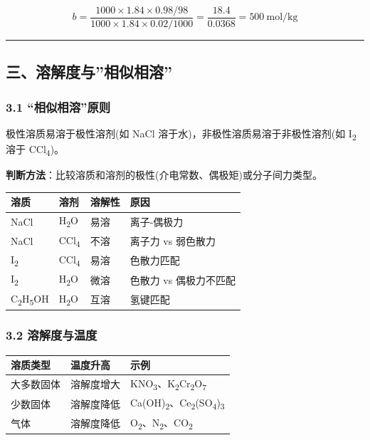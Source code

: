 \[
b = \frac{1000 \times 1.84 \times 0.98 / 98}{1000 \times 1.84 \times 0.02 / 1000} = \frac{18.4}{0.0368} = 500\ \mathrm{mol/kg}
\]

\begin{center}\rule{0.5\linewidth}{0.5pt}\end{center}

\subsection{三、溶解度与''相似相溶''}\label{ux4e09ux6eb6ux89e3ux5ea6ux4e0eux76f8ux4f3cux76f8ux6eb6}

\subsubsection{3.1 ``相似相溶''原则}\label{ux76f8ux4f3cux76f8ux6eb6ux539fux5219}

极性溶质易溶于极性溶剂(如 NaCl 溶于水)，非极性溶质易溶于非极性溶剂(如 I\textsubscript{2} 溶于 CCl\textsubscript{4})。

\textbf{判断方法}：比较溶质和溶剂的极性(介电常数、偶极矩)或分子间力类型。

{\def\LTcaptype{none} %
\begin{longtable}[]{@{}llll@{}}
\toprule\noalign{}
溶质 & 溶剂 & 溶解性 & 原因 \\
\midrule\noalign{}
\endhead
\bottomrule\noalign{}
\endlastfoot
NaCl & H\textsubscript{2}O & 易溶 & 离子-偶极力 \\
NaCl & CCl\textsubscript{4} & 不溶 & 离子力 vs 弱色散力 \\
I\textsubscript{2} & CCl\textsubscript{4} & 易溶 & 色散力匹配 \\
I\textsubscript{2} & H\textsubscript{2}O & 微溶 & 色散力 vs 偶极力不匹配 \\
C\textsubscript{2}H\textsubscript{5}OH & H\textsubscript{2}O & 互溶 & 氢键匹配 \\
\end{longtable}
}

\subsubsection{3.2 溶解度与温度}\label{ux6eb6ux89e3ux5ea6ux4e0eux6e29ux5ea6}

{\def\LTcaptype{none} %
\begin{longtable}[]{@{}lll@{}}
\toprule\noalign{}
溶质类型 & 温度升高 & 示例 \\
\midrule\noalign{}
\endhead
\bottomrule\noalign{}
\endlastfoot
大多数固体 & 溶解度增大 & KNO\textsubscript{3}、K\textsubscript{2}Cr\textsubscript{2}O\textsubscript{7} \\
少数固体 & 溶解度降低 & Ca(OH)\textsubscript{2}、Ce\textsubscript{2}(SO\textsubscript{4})\textsubscript{3} \\
气体 & 溶解度降低 & O\textsubscript{2}、N\textsubscript{2}、CO\textsubscript{2} \\
\end{longtable}
}

